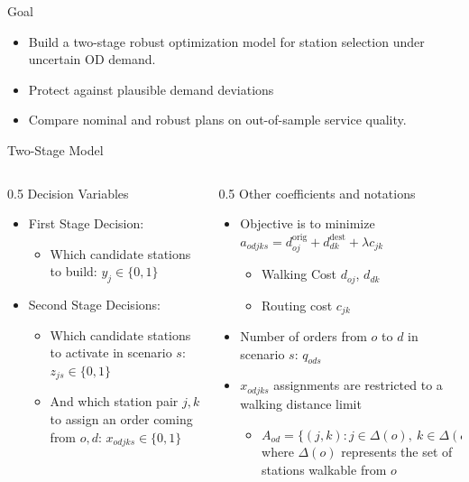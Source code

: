 \documentclass[aspectratio=169,11pt]{beamer}
\begin{document}
\begin{frame}{Goal}
	\begin{itemize}
		\item Build a two-stage robust optimization model for station selection under uncertain OD demand.
		\item Protect against plausible demand deviations
		\item Compare nominal and robust plans on out-of-sample service quality.
	\end{itemize}
\end{frame}

\begin{frame}{Two-Stage Model}
	\begin{columns}
		\begin{column}{0.5\textwidth}
			Decision Variables
			\begin{itemize}
				\item First Stage Decision:
				      \begin{itemize}
					      \item Which candidate stations to build: $y_j \in \{0,1\}$
				      \end{itemize}
				\item Second Stage Decisions:
				      \begin{itemize}
					      \item Which candidate stations to activate in scenario $s$:  $z_{js} \in \{0,1\}$
					      \item And which station pair $j, k$ to assign an order coming from $o, d$: $x_{odjks} \in \{0,1\}$
				      \end{itemize}
			\end{itemize}
		\end{column}

		\begin{column}{0.5\textwidth}
			Other coefficients and notations
			\begin{itemize}
				\item Objective is to minimize $a_{odjks} = d^{\mathrm{orig}}_{oj} + d^{\mathrm{dest}}_{dk} + \lambda c_{jk}$
				      \begin{itemize}
					      \item Walking Cost $d_{oj}$, $d_{dk}$
					      \item Routing cost $c_{jk}$
				      \end{itemize}
				\item Number of orders from $o$ to $d$ in scenario $s$: $q_{ods}$
				\item $x_{odjks}$ assignments are restricted to a walking distance limit
				      \begin{itemize}
					      \item $ A_{od} = \{(j,k): j \in \Delta(o),\ k \in \Delta(d)\}$ where $\Delta(o)$ represents the set of stations walkable from $o$
				      \end{itemize}
			\end{itemize}

		\end{column}
	\end{columns}
\end{frame}
\end{document}
